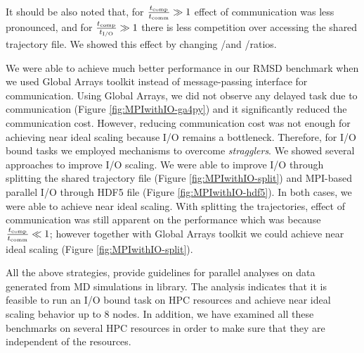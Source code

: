 It should be also noted that, for $\frac{{t}_{\text{comp}}}{t_{\text{comm}}} \gg 1$ effect of communication was less pronounced, and for $\frac{{t}_{\text{comp}}}{{t}_{\text{I/O}}} \gg 1$ there is less competition over accessing the shared trajectory file.
We showed this effect by changing \tcomp/\tIO and \tcomp/\tcomm ratios.

We were able to achieve much better performance in our RMSD benchmark when we used Global Arrays toolkit instead of message-passing interface for communication. 
Using Global Arrays, we did not observe any delayed task due to communication (Figure \ref{fig:MPIwithIO-ga4py}) and it significantly reduced the communication cost. 
However, reducing communication cost was not enough for achieving near ideal scaling because I/O remains a bottleneck.
Therefore, for I/O bound tasks we employed mechanisms to overcome \emph{stragglers}. 
We showed several approaches to improve I/O scaling.
We were able to improve I/O through splitting the shared trajectory file (Figure \ref{fig:MPIwithIO-split}) and MPI-based parallel I/O through HDF5 file (Figure \ref{fig:MPIwithIO-hdf5}). 
In both cases, we were able to achieve near ideal scaling.
With splitting the trajectories, effect of communication was still apparent on the performance which was because $\frac{{t}_{\text{comp}}}{t_{\text{comm}}} \ll 1$; however together with 
Global Arrays toolkit we could achieve near ideal scaling (Figure \ref{fig:MPIwithIO-split}).

All the above strategies, provide guidelines for parallel analyses on data generated from MD simulations in  library.
The analysis indicates that it is feasible to run an I/O bound task on HPC resources and achieve near ideal scaling behavior up to 8 nodes.
In addition, we have examined all these benchmarks on several HPC resources in order to make sure that they are independent of the resources.